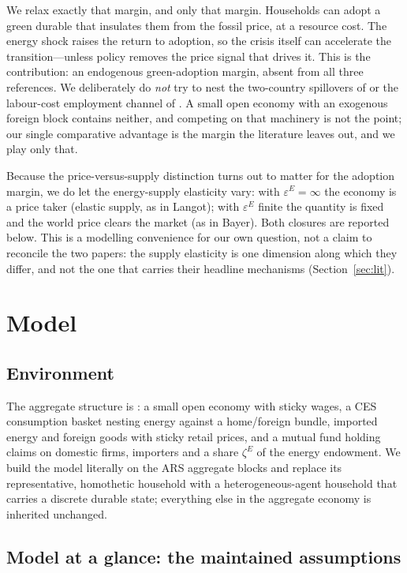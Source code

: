 \documentclass[11pt,a4paper]{article}
\begin{document}
We relax exactly that margin, and only that margin. Households can adopt a
green durable that insulates them from the fossil price, at a resource cost.
The energy shock raises the return to adoption, so the crisis itself can
accelerate the transition---unless policy removes the price signal that drives
it. This is the contribution: an endogenous green-adoption margin, absent from
all three references. We deliberately do \emph{not} try to nest the two-country
spillovers of \citet{Bayer2026} or the labour-cost employment channel of
\citet{Langot2026}. A small open economy with an exogenous foreign block
contains neither, and competing on that machinery is not the point; our single
comparative advantage is the margin the literature leaves out, and we play only
that.

Because the price-versus-supply distinction turns out to matter for the
adoption margin, we do let the energy-supply elasticity vary: with
$\varepsilon^{E}=\infty$ the economy is a price taker (elastic supply, as in
Langot); with $\varepsilon^{E}$ finite the quantity is fixed and the world
price clears the market (as in Bayer). Both closures are reported below. This
is a modelling convenience for our own question, not a claim to reconcile the
two papers: the supply elasticity is one dimension along which they differ, and
not the one that carries their headline mechanisms (Section~\ref{sec:lit}).

\section{Model}

\subsection{Environment}

The aggregate structure is \citet{ARS2024}: a small open economy with sticky
wages, a CES consumption basket nesting energy against a home/foreign bundle,
imported energy and foreign goods with sticky retail prices, and a mutual fund
holding claims on domestic firms, importers and a share $\zeta^{E}$ of the
energy endowment. We build the model literally on the ARS aggregate blocks and
replace its representative, homothetic household with a heterogeneous-agent
household that carries a discrete durable state; everything else in the
aggregate economy is inherited unchanged.

\subsection{Model at a glance: the maintained assumptions}
\label{sec:assumptions}
\end{document}
